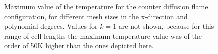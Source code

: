 \begin{figure}[tbp]
	\centering
	\caption{Maximum value of the temperature for the counter diffusion flame configuration, for different mesh sizes in the x-direction and polynomial degrees. Values for $k=1$ are not shown, because for this range of cell lengths the maximum temperature value was of the order of 50K higher than the ones depicted here.}
	\label{fig:TemperatureConvergenceDiffFlame}
\end{figure}
\FloatBarrier
\newpage
